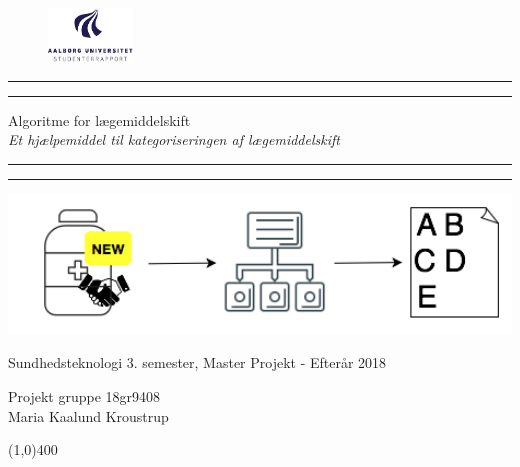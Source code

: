 \clearpage
\thispagestyle{empty}

\begin{figure}[H]
	\raggedleft
	\includegraphics[width=0.2\textwidth]{billeder/aau_logo_da.pdf}
\end{figure} 

\begin{center}	
	\rule{\textwidth}{1.6pt}\vspace*{-\baselineskip}\vspace*{2pt} %
	\rule{\textwidth}{0.4pt} %
	
	\vspace{0.75\baselineskip} %
	
	{\Huge Algoritme for lægemiddelskift} \\ \vspace{3mm}%
	{\Large\textit{Et hjælpemiddel til kategoriseringen af lægemiddelskift}}
	\vspace{0.75\baselineskip} %
	
	\rule{\textwidth}{0.4pt}\vspace*{-\baselineskip}\vspace{3.2pt} %
	\rule{\textwidth}{1.6pt} %
	
	\vspace{3.5\baselineskip} %
		\includegraphics[width=1\textwidth]{Statusseminar/statusforside.png} \\
		\vspace{3cm}
	 		\begin{Large}
	 		Sundhedsteknologi 3. semester, Master Projekt - Efterår 2018\\
		\vspace{1cm}
			\end{Large}
	{\large Projekt gruppe 18gr9408 \\
	Maria Kaalund Kroustrup}
\end{center}
\vspace*{\fill}

\begin{center}
	\line(1,0){400}
\end{center}



